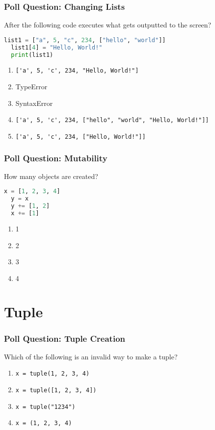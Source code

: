 \documentclass{beamer}
\begin{document}
%
%
\begin{frame}[fragile]
  \frametitle{Poll Question: Changing Lists}
  After the following code executes what gets outputted to the screen?
  \begin{lstlisting}[language=Python, autogobble]
  list1 = ["a", 5, "c", 234, ["hello", "world"]]
  list1[4] = "Hello, World!"
  print(list1)
  \end{lstlisting}
  \vfill
  \begin{enumerate}[A] 
    \item \lstinline|['a', 5, 'c', 234, "Hello, World!"]| %
    \item TypeError
    \item SyntaxError
    \item \lstinline|['a', 5, 'c', 234, ["hello", "world", "Hello, World!"]]|
    \item \lstinline|['a', 5, 'c', 234, ["Hello, World!"]]|
  \end{enumerate}
\end{frame}

%
%
\begin{frame}[fragile]
  \frametitle{Poll Question: Mutability} 
  How many objects are created?
  \begin{lstlisting}[language=Python, autogobble]
  x = [1, 2, 3, 4]
  y = x
  y += [1, 2]
  x += [1]
  \end{lstlisting}
  \vfill
  \begin{enumerate}[A] 
    \item 1
    \item 2
    \item 3
    \item 4
  \end{enumerate}
\end{frame}
\section{Tuple}

%
%
\begin{frame}[fragile]
  \frametitle{Poll Question: Tuple Creation}
  Which of the following is an invalid way to make a tuple? 
  \vfill
  \begin{enumerate}[A] 
    \item \lstinline|x = tuple(1, 2, 3, 4)|
    \item \lstinline|x = tuple([1, 2, 3, 4])|
    \item \lstinline|x = tuple("1234")|
    \item \lstinline|x = (1, 2, 3, 4)|
  \end{enumerate}
\end{frame}
\end{document}
